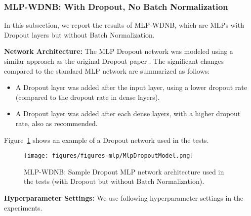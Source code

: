 \documentclass[../dropout-vs-batch-normalization.tex]{subfiles}
\begin{document}
\medskip
\subsubsection{MLP-WDNB: With Dropout, No Batch Normalization}
In this subsection, we report the results of MLP-WDNB, which are MLPs with Dropout layers but without Batch Normalization.

\smallskip
\noindent\textbf{Network Architecture:} The MLP Dropout network was modeled using a similar approach as the original Dropout paper \cite{Srivastava2014}. The significant changes compared to the standard MLP network are summarized as follows:

\begin{itemize}
\item A Dropout layer was added after the input layer, using a lower dropout rate (compared to the dropout rate in dense layers).
\item A Dropout layer was added after each dense layers, with a higher dropout rate, also as recommended.
\end{itemize}

Figure~\ref{fig:MlpDropoutModel} shows an example of a Dropout network used in the tests.

\begin{figure}
\centerline{\texttt{[image: figures/figures-mlp/MlpDropoutModel.png]}}
\caption{MLP-WDNB: Sample Dropout MLP network architecture used in the tests (with Dropout but without Batch Normalization).}
\label{fig:MlpDropoutModel}
\end{figure}

\medskip
\noindent\textbf{Hyperparameter Settings:} We use following hyperparameter settings in the experiments.
\end{document}

